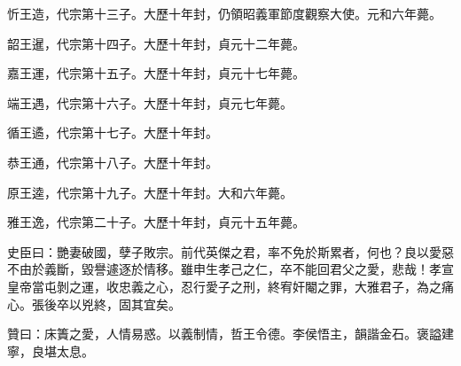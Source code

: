 \begin{pinyinscope}
 忻王造，代宗第十三子。大歷十年封，仍領昭義軍節度觀察大使。元和六年薨。



 韶王暹，代宗第十四子。大歷十年封，貞元十二年薨。



 嘉王運，代宗第十五子。大歷十年封，貞元十七年薨。



 端王遇，代宗第十六子。大歷十年封，貞元七年薨。



 循王遹，代宗第十七子。大歷十年封。



 恭王通，代宗第十八子。大歷十年封。



 原王逵，代宗第十九子。大歷十年封。大和六年薨。



 雅王逸，代宗第二十子。大歷十年封，貞元十五年薨。



 史臣曰：艷妻破國，孽子敗宗。前代英傑之君，率不免於斯累者，何也？良以愛惡不由於義斷，毀譽遽逐於情移。雖申生孝己之仁，卒不能回君父之愛，悲哉！孝宣皇帝當屯剝之運，收忠義之心，忍行愛子之刑，終宥奸閹之罪，大雅君子，為之痛心。張後卒以兇終，固其宜矣。



 贊曰：床簀之愛，人情易惑。以義制情，哲王令德。李侯悟主，韻諧金石。褒謚建寧，良堪太息。



\end{pinyinscope}